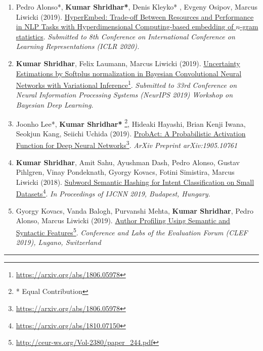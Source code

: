 \documentclass[10pt,letterpaper]{article}
\begin{document}
\begin{enumerate}
	\parskip=0.1em
	
	\item Pedro Alonso*, \textbf{Kumar Shridhar*}, Denis Kleyko* ,  Evgeny Osipov, Marcus Liwicki (2019). \href {https://openreview.net/pdf?id=SJgzXaNFwS} {HyperEmbed: Trade-off Between Resources and Performance in NLP Tasks with Hyperdimensional Computing-based embedding of $n$-gram statistics}. \emph{Submitted to 8th Conference on International Conference on Learning Representations (ICLR 2020).}
	
	\item\textbf{Kumar Shridhar}, Felix Laumann, Marcus Liwicki (2019). \href{https://arxiv.org/abs/1806.05978}{Uncertainty Estimations by Softplus normalization in Bayesian Convolutional Neural Networks with Variational Inference}\footnote{\url{https://arxiv.org/abs/1806.05978}}. \emph{Submitted to 33rd Conference on Neural Information Processing Systems (NeurIPS 2019) Workshop on Bayesian Deep Learning.}
	
	\item Joonho Lee*, \textbf{Kumar Shridhar*} \footnote{* Equal Contribution}, Hideaki Hayashi, Brian Kenji Iwana, Seokjun Kang, Seiichi Uchida (2019). \href{https://arxiv.org/abs/1905.10761}{ProbAct: A Probabilistic Activation Function for Deep Neural Networks}\footnote{\url{https://arxiv.org/abs/1806.05978}}. \emph{ArXiv Preprint arXiv:1905.10761}
	
	\item\textbf{Kumar Shridhar}, Amit Sahu, Ayushman Dash, Pedro Alonso, Gustav Pihlgren, Vinay Pondeknath,  Gyorgy Kovacs, Fotini Simistira, Marcus Liwicki (2018). \href{https://arxiv.org/abs/1810.07150}{Subword Semantic Hashing for Intent Classification on Small Datasets}\footnote{\url{https://arxiv.org/abs/1810.07150}}. \emph{In Proceedings of IJCNN 2019, Budapest, Hungary.}
	
	\item Gyorgy Kovacs, Vanda Balogh, Purvanshi Mehta, \textbf{Kumar Shridhar}, Pedro Alonso, Marcus Liwicki (2019). \href{http://ceur-ws.org/Vol-2380/paper_244.pdf}{Author Profiling Using Semantic and Syntactic Features}\footnote{\url{http://ceur-ws.org/Vol-2380/paper_244.pdf}}. \emph{Conference and Labs of the Evaluation Forum (CLEF 2019), Lugano, Switzerland}
	
\end{enumerate}

\hrule
\vspace{-0.4em}
\end{document}
